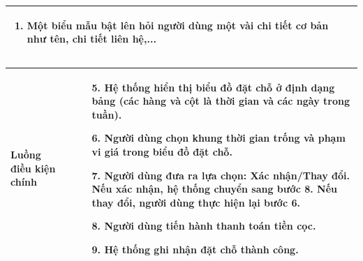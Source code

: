 \begin{enumerate}
\begin{center}{\color{black}}
\begin{tabular}{|p{5cm}|p{7cm}|}
\begin{enumerate}[1.]
                \item Một biểu mẫu bật lên hỏi người dùng một vài chi tiết cơ bản như tên, chi tiết liên hệ,...
                
			    
            \end{enumerate}\\\hline
        
    \end{tabular}
\end{center}


\begin{center}{\color{black}}

    \begin{tabular}{|p{5cm}|p{7cm}|} \hline
        
        Luồng điều kiện chính &  
            \begin{enumerate}
                \item[5.] Hệ thống hiển thị biểu đồ đặt chỗ ở định dạng bảng (các hàng và cột là thời gian và các ngày trong tuần).
                \item[6.] Người dùng chọn khung thời gian trống và phạm vi giá trong biểu đồ đặt chỗ.
                
				\item[7.] Người dùng đưa ra lựa chọn: Xác nhận/Thay đổi. Nếu xác nhận, hệ thống chuyển sang bước 8. Nếu thay đổi, người dùng thực hiện lại bước 6.
			
				\item[8.] Người dùng tiến hành thanh toán tiền cọc.
				\item[9.] Hệ thống ghi nhận đặt chỗ thành công.
			
            \end{enumerate}\\\hline
        

\end{tabular}
\end{center}
\end{enumerate}
